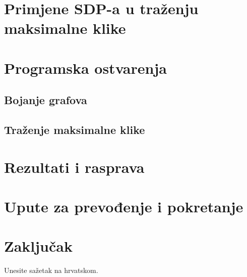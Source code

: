 \documentclass[diplomskirad]{fer}
\begin{document}
\chapter{Primjene SDP-a u traženju maksimalne klike}
\label{pog:primjene_SDP-a_u_traženju_maksimalne_klike}

\chapter{Programska ostvarenja}
\label{pog:programska_ostvarenja}
\section{Bojanje grafova}
\section{Traženje maksimalne klike}


\chapter{Rezultati i rasprava}
\label{pog:rezultati_i_rasprava}

\chapter{Upute za prevođenje i pokretanje}
\label{pog:upute_za_prevođenje_i_pokretanje}

\chapter{Zaključak}
\label{pog:zakljucak}








\begin{sazetak}
  Unesite sažetak na hrvatskom.

\end{sazetak}
\end{document}
